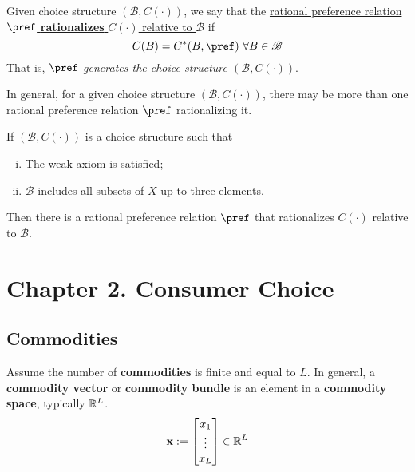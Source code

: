 \documentclass{article}
\begin{document}
		\begin{definition}[1.D.1]
			Given choice structure $(\mathscr{B}, C(\cdot))$, we say that the \ul{rational preference relation $\pref$ \textbf{rationalizes} $C(\cdot)$ relative to $\mathscr{B}$} if
			\begin{equation}
				C(B) = C^*(B, \pref)\ \forall B \in \mathscr{B}
			\end{equation}
			That is, \emph{$\pref$ generates the choice structure $(\mathscr{B}, C(\cdot))$}.
		\end{definition}
		
		\begin{remark}
			In general, for a given choice structure $(\mathscr{B}, C(\cdot))$, there may be more than one rational preference relation $\pref$ rationalizing it.
		\end{remark}
		
		\begin{proposition}
			If $(\mathscr{B}, C(\cdot))$ is a choice structure such that
			\begin{enumerate}[(i)]
				\item The weak axiom is satisfied;
				\item $\mathscr{B}$ includes all subsets of $X$ up to three elements.
			\end{enumerate}
			Then there is a rational preference relation $\pref$ that rationalizes $C(\cdot)$ relative to $\mathscr{B}$.
		\end{proposition}
	
	\section{Chapter 2. Consumer Choice}
		\subsection{Commodities}
			\begin{definition}
				Assume the number of \textbf{commodities} is finite and equal to $L$. In general, a \textbf{commodity vector} or \textbf{commodity bundle} is an element in a \textbf{commodity space}, typically $\mathbb{R}^L$.
				\begin{equation}
					\textbf{x} := \begin{bmatrix}
						x_1 \\ \vdots \\ x_L
					\end{bmatrix} \in \mathbb{R}^L
				\end{equation}
 			\end{definition}
 			
\end{document}
